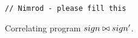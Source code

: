 \begin{figure}
\centering
\begin{lstlisting}
// Nimrod - please fill this 
\end{lstlisting}
\caption{Correlating program $sign \bowtie sign'$.}
\end{figure}
